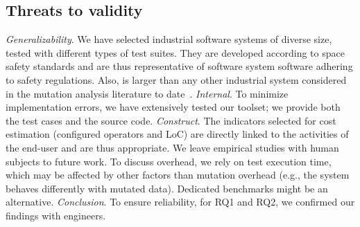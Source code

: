






\subsection{Threats to validity} 



\emph{Generalizability}. We have selected industrial software systems of diverse size, tested with different types of test suites. They are developed according to space safety standards and are thus  representative of software system software adhering to safety regulations. Also, \ESAIL is larger than any other industrial system considered in the mutation analysis literature to date~\cite{Ramler2017,delgado2018evaluation,Baker2013,denisov2018mull}.
{\emph{Internal}. To minimize implementation errors, we have extensively tested our toolset; we provide both the test cases and the \APPR source code.}
{\emph{Construct}. The indicators selected for cost estimation (configured operators and LoC) are directly linked to the activities of the end-user and are thus appropriate. We leave empirical studies with human subjects to future work. To discuss overhead, we rely on test execution time, which may be affected by other factors than mutation overhead (e.g., the system behaves differently with mutated data). Dedicated benchmarks might be an alternative.}
{\emph{Conclusion}. To ensure reliability, for RQ1 and RQ2, we confirmed our findings with engineers.}

